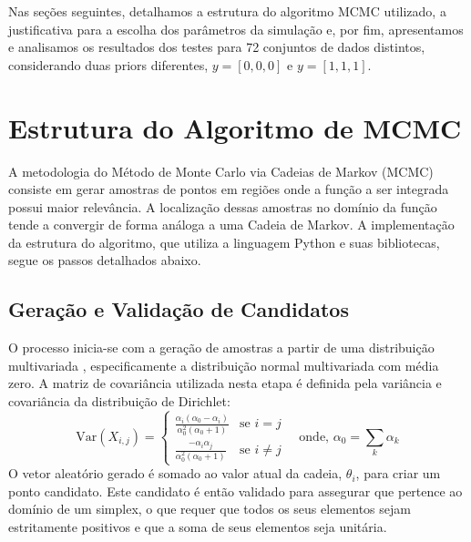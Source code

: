 \documentclass[12pt, a4paper]{article}
\begin{document}
Nas seções seguintes, detalhamos a estrutura do algoritmo MCMC utilizado, a justificativa para a escolha dos parâmetros da simulação e, por fim, apresentamos e analisamos os resultados dos testes para 72 conjuntos de dados distintos, considerando duas priors diferentes, $y=[0,0,0]$ e $y=[1,1,1]$.




\section{Estrutura do Algoritmo de MCMC}

A metodologia do Método de Monte Carlo via Cadeias de Markov (MCMC) consiste em gerar amostras de pontos em regiões onde a função a ser integrada possui maior relevância. A localização dessas amostras no domínio da função tende a convergir de forma análoga a uma Cadeia de Markov. A implementação da estrutura do algoritmo, que utiliza a linguagem Python e suas bibliotecas, segue os passos detalhados abaixo.

\subsection{Geração e Validação de Candidatos}
O processo inicia-se com a geração de amostras a partir de uma distribuição multivariada , especificamente a distribuição normal multivariada com média zero. A matriz de covariância utilizada nesta etapa é definida pela variância e covariância da distribuição de Dirichlet:
\begin{equation}
    \text{Var}(X_{i,j}) =
    \begin{cases}
        \frac{\alpha_i(\alpha_0 - \alpha_i)}{\alpha_0^2(\alpha_0 + 1)} & \text{se } i=j \\
        \frac{-\alpha_i \alpha_j}{\alpha_0^2(\alpha_0 + 1)} & \text{se } i \neq j
    \end{cases}
    \quad \text{onde, } \alpha_0 = \sum_{k} \alpha_k
\end{equation}
O vetor aleatório gerado é somado ao valor atual da cadeia, $\theta_i$, para criar um ponto candidato. Este candidato é então validado para assegurar que pertence ao domínio de um simplex, o que requer que todos os seus elementos sejam estritamente positivos e que a soma de seus elementos seja unitária.
\end{document}
